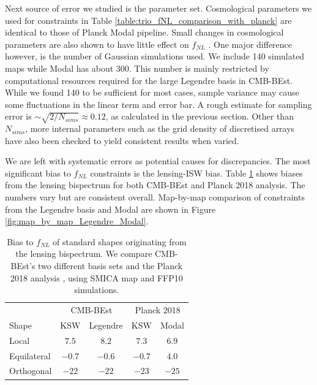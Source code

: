 Next source of error we studied is the parameter set. Cosmological parameters we used for constraints in Table \ref{table:trio_fNL_comparison_with_planck} are identical to those of Planck Modal pipeline. Small changes in cosmological parameters are also shown to have little effect on $f_{NL}$ \cite{PlanckCollaboration2015,PlanckCollaboration2018}. One major difference however, is the number of Gaussian simulations used. We include 140 simulated maps while Modal has about 300. This number is mainly restricted by computational resources required for the large Legendre basis in CMB-BEst. While we found 140 to be sufficient for most cases, sample variance may cause some fluctuations in the linear term and error bar. A rough estimate for sampling error is $\sim \sqrt{2/N_{sims}} \approx 0.12$, as calculated in the previous section. Other than $N_{sims}$, more internal parameters such as the grid density of discretised arrays have also been checked to yield consistent results when varied. 

We are left with systematic errors as potential causes for discrepancies. The most significant bias to $f_{NL}$ constraints is the lensing-ISW bias. Table \ref{table:trio_lensing_bias_comparison_with_planck} shows biases from the lensing bispectrum \cite{Lewis2011lensing} for both CMB-BEst and Planck 2018 analysis. The numbers vary but are consistent overall. Map-by-map comparison of constraints from the Legendre basis and Modal are shown in Figure \ref{fig:map_by_map_Legendre_Modal}. 

\begin{table}[h]
	\caption{Bias to $f_{NL}$ of standard shapes originating from the lensing bispectrum. We compare CMB-BEst's two different basis sets and the Planck 2018 analysis \cite{PlanckCollaboration2018}, using SMICA map and FFP10 simulations. }
	\centering
	\label{table:trio_lensing_bias_comparison_with_planck}
	\renewcommand{\arraystretch}{1.5} 
	\begin{tabular}{lcccc}
		\toprule
		& \multicolumn{2}{c}{CMB-BEst} & \multicolumn{2}{c}{Planck 2018} \\ \cmidrule(lr){2-3} \cmidrule(lr){4-5}
		Shape & KSW &  Legendre &  KSW &  Modal \\
		\midrule
		
		Local & $7.5$ & $8.2$ & $7.3$ & $6.9$ \\
		Equilateral & $-0.7$ & $-0.6$ & $-0.7$ & $4.0$\\
		Orthogonal & $-22$ & $-22$ & $-23$ & $-25$ \\
		\bottomrule
	\end{tabular}
\end{table}

